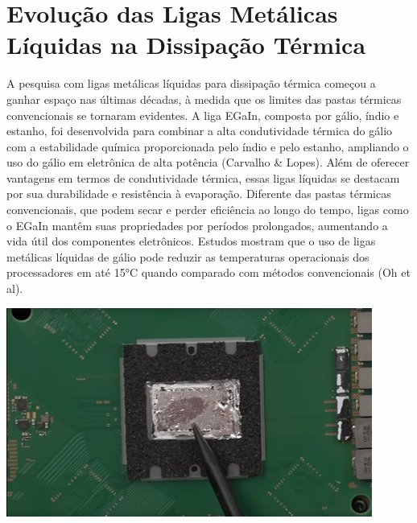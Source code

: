 \documentclass{article}
\begin{document}
\section{Evolução das Ligas Metálicas Líquidas na Dissipação Térmica}
A pesquisa com ligas metálicas líquidas para dissipação térmica começou a ganhar espaço nas últimas décadas, à medida que os limites das pastas térmicas convencionais se tornaram evidentes. A liga EGaIn, composta por gálio, índio e estanho, foi desenvolvida para combinar a alta condutividade térmica do gálio com a estabilidade química proporcionada pelo índio e pelo estanho, ampliando o uso do gálio em eletrônica de alta potência (Carvalho \& Lopes).
Além de oferecer vantagens em termos de condutividade térmica, essas ligas líquidas se destacam por sua durabilidade e resistência à evaporação. Diferente das pastas térmicas convencionais, que podem secar e perder eficiência ao longo do tempo, ligas como o EGaIn mantêm suas propriedades por períodos prolongados, aumentando a vida útil dos componentes eletrônicos. Estudos mostram que o uso de ligas metálicas líquidas de gálio pode reduzir as temperaturas operacionais dos processadores em até 15°C quando comparado com métodos convencionais (Oh et al).
\begin{adjustbox}{center,caption={Chip que utiliza metal liquido como interface termica},nofloat=figure,vspace=\bigskipamount}
    \centering
    \includegraphics[width=12cm]{chip.png}
\end{adjustbox}
\end{document}
